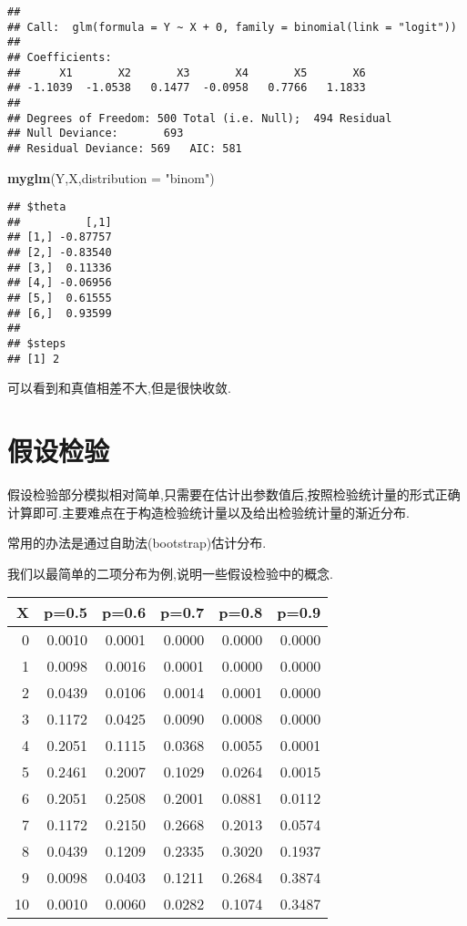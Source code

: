 \documentclass[]{ctexbook}
\newenvironment{Shaded}{\begin{snugshade}}{\end{snugshade}}
\newcommand{\DataTypeTok}[1]{\textcolor[rgb]{0.13,0.29,0.53}{#1}}
\newcommand{\KeywordTok}[1]{\textcolor[rgb]{0.13,0.29,0.53}{\textbf{#1}}}
\newcommand{\NormalTok}[1]{#1}
\newcommand{\StringTok}[1]{\textcolor[rgb]{0.31,0.60,0.02}{#1}}
\begin{document}
\begin{verbatim}
## 
## Call:  glm(formula = Y ~ X + 0, family = binomial(link = "logit"))
## 
## Coefficients:
##      X1       X2       X3       X4       X5       X6  
## -1.1039  -1.0538   0.1477  -0.0958   0.7766   1.1833  
## 
## Degrees of Freedom: 500 Total (i.e. Null);  494 Residual
## Null Deviance:       693 
## Residual Deviance: 569   AIC: 581
\end{verbatim}

\begin{Shaded}
\begin{Highlighting}[]
\KeywordTok{myglm}\NormalTok{(Y,X,}\DataTypeTok{distribution  =} \StringTok{"binom"}\NormalTok{)}
\end{Highlighting}
\end{Shaded}

\begin{verbatim}
## $theta
##          [,1]
## [1,] -0.87757
## [2,] -0.83540
## [3,]  0.11336
## [4,] -0.06956
## [5,]  0.61555
## [6,]  0.93599
## 
## $steps
## [1] 2
\end{verbatim}

可以看到和真值相差不大,但是很快收敛.

\hypertarget{section-10}{%
\chapter{假设检验}\label{section-10}}

假设检验部分模拟相对简单,只需要在估计出参数值后,按照检验统计量的形式正确计算即可.主要难点在于构造检验统计量以及给出检验统计量的渐近分布.

常用的办法是通过自助法(bootstrap)估计分布.

我们以最简单的二项分布为例,说明一些假设检验中的概念.

\begin{tabular}{r|r|r|r|r|r}
\hline
X & p=0.5 & p=0.6 & p=0.7 & p=0.8 & p=0.9\\
\hline
0 & 0.0010 & 0.0001 & 0.0000 & 0.0000 & 0.0000\\
\hline
1 & 0.0098 & 0.0016 & 0.0001 & 0.0000 & 0.0000\\
\hline
2 & 0.0439 & 0.0106 & 0.0014 & 0.0001 & 0.0000\\
\hline
3 & 0.1172 & 0.0425 & 0.0090 & 0.0008 & 0.0000\\
\hline
4 & 0.2051 & 0.1115 & 0.0368 & 0.0055 & 0.0001\\
\hline
5 & 0.2461 & 0.2007 & 0.1029 & 0.0264 & 0.0015\\
\hline
6 & 0.2051 & 0.2508 & 0.2001 & 0.0881 & 0.0112\\
\hline
7 & 0.1172 & 0.2150 & 0.2668 & 0.2013 & 0.0574\\
\hline
8 & 0.0439 & 0.1209 & 0.2335 & 0.3020 & 0.1937\\
\hline
9 & 0.0098 & 0.0403 & 0.1211 & 0.2684 & 0.3874\\
\hline
10 & 0.0010 & 0.0060 & 0.0282 & 0.1074 & 0.3487\\
\hline
\end{tabular}
\end{document}
